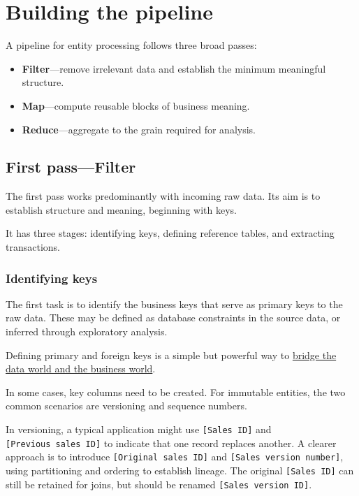 \documentclass[10pt,openany,10pt]{book}
\providecommand{\tightlist}{%
  \setlength{\itemsep}{0pt}\setlength{\parskip}{0pt}}
\begin{document}
\section{Building the pipeline}\label{building-the-pipeline}

A pipeline for entity processing follows three broad passes:

\begin{itemize}
\tightlist
\item
  \textbf{Filter}---remove irrelevant data and establish the minimum
  meaningful structure.
\item
  \textbf{Map}---compute reusable blocks of business meaning.
\item
  \textbf{Reduce}---aggregate to the grain required for analysis.
\end{itemize}

\subsection{First pass---Filter}\label{first-passfilter}

The first pass works predominantly with incoming raw data. Its aim is to
establish structure and meaning, beginning with keys.

It has three stages: identifying keys, defining reference tables, and
extracting transactions.

\subsubsection{Identifying keys}\label{identifying-keys}

The first task is to identify the business keys that serve as primary
keys to the raw data. These may be defined as database constraints in
the source data, or inferred through exploratory analysis.

Defining primary and foreign keys is a simple but powerful way to
\hyperref[docs-creating-information-mapping-the-data-world]{bridge the
data world and the business world}.

In some cases, key columns need to be created. For immutable entities,
the two common scenarios are versioning and sequence numbers.

In versioning, a typical application might use \texttt{{[}Sales\ ID{]}}
and \texttt{{[}Previous\ sales\ ID{]}} to indicate that one record
replaces another. A clearer approach is to introduce
\texttt{{[}Original\ sales\ ID{]}} and
\texttt{{[}Sales\ version\ number{]}}, using partitioning and ordering
to establish lineage. The original \texttt{{[}Sales\ ID{]}} can still be
retained for joins, but should be renamed
\texttt{{[}Sales\ version\ ID{]}}.
\end{document}
